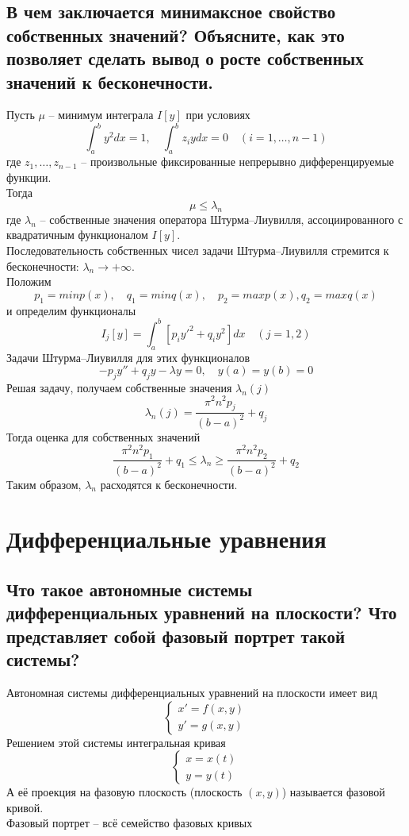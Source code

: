 \documentclass{article}
\begin{document}
\subsection{В чем заключается минимаксное свойство собственных значений? Объясните, как это позволяет сделать вывод о росте собственных значений к бесконечности.}
Пусть $\mu$ -- минимум интеграла $I[y]$ при условиях 
\[\int_{a}^{b}y^2dx=1, \quad \int_{a}^{b} z_iydx=0 \quad (i=1,\dots, n-1)\]
где $z_1,\dots,z_{n-1}$ -- произвольные фиксированные непрерывно дифференцируемые функции. \\
Тогда \[\mu \le \lambda_n\]
где $\lambda_n$ -- собственные значения оператора Штурма--Лиувилля, ассоциированного с квадратичным функционалом $I[y]$. \\
Последовательность собственных чисел задачи Штурма--Лиувилля стремится к бесконечности: $\lambda_n \to +\infty $. \\
Положим \[p_1 = min p(x), \quad q_1 = min q(x), \quad p_2 = max p(x), q_2 = max q(x)\]
и определим функционалы \[I_j[y]=\int_{a}^{b}[p_iy'^2+q_iy^2]dx \quad (j=1,2)\]
Задачи Штурма--Лиувилля для этих функционалов \[-p_jy''+q_jy-\lambda y=0, \quad y(a)=y(b)=0\]
Решая задачу, получаем собственные значения $\lambda_n(j)$ \[\lambda_n(j)=\frac{\pi^2n^2p_j}{(b-a)^2}+q_j\]
Тогда оценка для собственных значений \[\frac{\pi^2n^2p_1}{(b-a)^2}+q_1 \le \lambda_n \ge \frac{\pi^2n^2p_2}{(b-a)^2}+q_2\]
Таким образом, $\lambda_n$ расходятся к бесконечности. 

\section{Дифференциальные уравнения}
\subsection{Что такое автономные системы дифференциальных уравнений на плоскости? Что представляет собой фазовый портрет такой системы?}
Автономная системы дифференциальных уравнений на плоскости имеет вид
\[ \left\{\begin{matrix}
	x'=f(x,y)\\ 
	y'=g(x,y)
\end{matrix}\right. \]
Решением этой системы интегральная кривая 
\[ \left\{\begin{matrix}
	x=x(t)\\ 
	y=y(t)
\end{matrix}\right. \]
А её проекция на фазовую плоскость (плоскость $ (x, y) $) называется фазовой кривой.\\
Фазовый портрет -- всё семейство фазовых кривых
\end{document}
